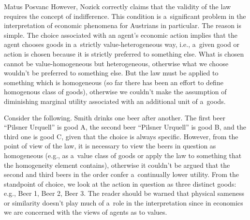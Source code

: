 \begin{artengenv}{Matus Posvanc}
However, Nozick 
\parencite*[][]{Nozick1977On} %
 correctly claims that the validity of the law requires the concept of indifference. This condition is a~significant problem in the interpretation of economic phenomena for Austrians in particular. The reason is simple. The choice associated with an agent's economic action implies that the agent chooses goods in a~strictly value-heterogeneous way, i.e., a~given good or action is chosen because it is strictly preferred to something else. What is chosen cannot be value-homogeneous but heterogeneous, otherwise what we choose wouldn't be preferred to something else. But the law must be applied to something which is homogeneous (so far there has been an effort to define homogenous class of goods), otherwise we couldn't make the assumption of diminishing marginal utility associated with an additional unit of a~goods.



Consider the following. Smith drinks one beer after another. The first beer ``Pilsner Urquell'' is good A, the second beer ``Pilsner Urquell'' is good B, and the third one is good C, given that the choice is always specific. However, from the point of view of the law, it is necessary to view the beers in question as homogeneous (e.g., as a~value class of goods or apply the law to something that the homogeneity element contains), otherwise it couldn't be argued that the second and third beers in the order confer a~continually lower utility. From the standpoint of choice, we look at the action in question as three distinct goods: e.g., Beer 1, Beer 2, Beer 3. The reader should be warned that physical sameness or similarity doesn't play much of a~role in the interpretation since in economics we are concerned with the views of agents as to values.




\end{artengenv}
